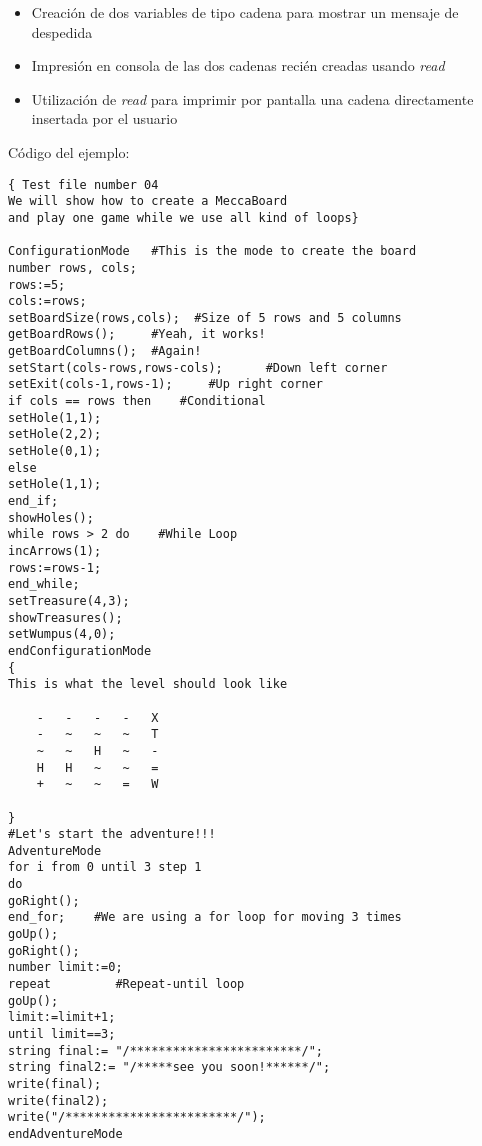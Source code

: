 \documentclass[a4paper,12pt,twoside,openright]{report}
\begin{document}
{\begin{itemize}
\begin{itemize}
      \begin{itemize}
      \item Llegada de Mecca a la casilla del tesoro
      \item Llegada de Mecca a la casilla de salida
      \end{itemize}
      \item Creación de dos variables de tipo cadena para mostrar un mensaje de despedida
      \item Impresión en consola de las dos cadenas recién creadas usando \emph{read}
      \item Utilización de \emph{read} para imprimir por pantalla una cadena directamente insertada por el usuario
      \end{itemize}
   \end{itemize}
  
  Código del ejemplo:
  \begin{lstlisting}
{ Test file number 04
We will show how to create a MeccaBoard 
and play one game while we use all kind of loops}

ConfigurationMode   #This is the mode to create the board
number rows, cols;
rows:=5;
cols:=rows;
setBoardSize(rows,cols);  #Size of 5 rows and 5 columns
getBoardRows();     #Yeah, it works!
getBoardColumns();  #Again!
setStart(cols-rows,rows-cols);      #Down left corner
setExit(cols-1,rows-1);	    #Up right corner
if cols == rows then    #Conditional
setHole(1,1);	    
setHole(2,2);
setHole(0,1);
else
setHole(1,1);
end_if;
showHoles();
while rows > 2 do    #While Loop
incArrows(1);
rows:=rows-1;
end_while;
setTreasure(4,3);
showTreasures();
setWumpus(4,0);
endConfigurationMode
{
This is what the level should look like

	-	-	-	-	X
	-	~	~	~	T
	~	~	H	~	-
	H	H	~	~	=
	+	~	~	=	W

}
#Let's start the adventure!!!
AdventureMode
for i from 0 until 3 step 1
do
goRight();
end_for;	#We are using a for loop for moving 3 times
goUp();		
goRight();
number limit:=0;
repeat         #Repeat-until loop
goUp();
limit:=limit+1;
until limit==3;
string final:= "/************************/";
string final2:= "/*****see you soon!******/";
write(final);
write(final2);
write("/************************/");
endAdventureMode
  \end{lstlisting}


%

}
\end{document}
